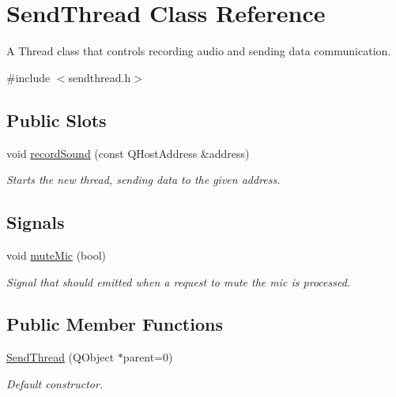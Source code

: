 \hypertarget{class_send_thread}{
\section{\-Send\-Thread \-Class \-Reference}
\label{class_send_thread}
}


\-A \-Thread class that controls recording audio and sending data communication.  




{\ttfamily \#include $<$sendthread.\-h$>$}

\subsection*{\-Public \-Slots}
\begin{DoxyCompactItemize}
\item 
void \hyperlink{class_send_thread_ace7f54d057aea7d6ef58949333095f35}{record\-Sound} (const \-Q\-Host\-Address \&address)
\begin{DoxyCompactList}\small\item\em \-Starts the new thread, sending data to the given address. \end{DoxyCompactList}\end{DoxyCompactItemize}
\subsection*{\-Signals}
\begin{DoxyCompactItemize}
\item 
void \hyperlink{class_send_thread_afff2d01a9c3f193f68840d8bfc3af83d}{mute\-Mic} (bool)
\begin{DoxyCompactList}\small\item\em \-Signal that should emitted when a request to mute the mic is processed. \end{DoxyCompactList}\end{DoxyCompactItemize}
\subsection*{\-Public \-Member \-Functions}
\begin{DoxyCompactItemize}
\item 
\hyperlink{class_send_thread_a69eb38313a68a80b495277f05fa4f7ca}{\-Send\-Thread} (\-Q\-Object $\ast$parent=0)
\begin{DoxyCompactList}\small\item\em \-Default constructor. \end{DoxyCompactList}\end{DoxyCompactItemize}
